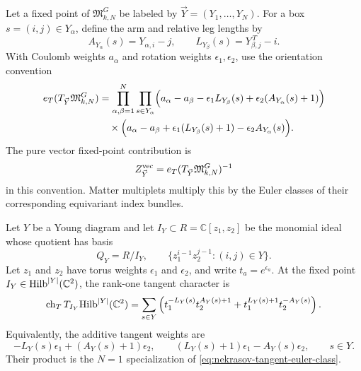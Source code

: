 \begin{definition}
\label{def:nekrasov-tangent-euler-class}
Let a fixed point of \(\mathfrak M_{k,N}^{G}\) be labeled by
\(\vec Y=(Y_1,\ldots,Y_N)\).  For a box \(s=(i,j)\in Y_\alpha\), define the
arm and relative leg lengths by
\[
  A_{Y_\alpha}(s)=Y_{\alpha,i}-j,
  \qquad
  L_{Y_\beta}(s)=Y_{\beta,j}^{\,T}-i .
\]
With Coulomb weights \(a_\alpha\) and rotation weights
\(\epsilon_1,\epsilon_2\), use the orientation convention
\begin{equation}
\begin{aligned}
  e_T(T_{\vec Y}\mathfrak M_{k,N}^{G})
  &=
  \prod_{\alpha,\beta=1}^{N}
  \prod_{s\in Y_\alpha}
  \Bigl(a_\alpha-a_\beta
  -\epsilon_1L_{Y_\beta}(s)
  +\epsilon_2(A_{Y_\alpha}(s)+1)\Bigr)
\\
  &\quad\times
  \Bigl(a_\alpha-a_\beta
  +\epsilon_1(L_{Y_\beta}(s)+1)
  -\epsilon_2A_{Y_\alpha}(s)\Bigr).
  \label{eq:nekrasov-tangent-euler-class}
\end{aligned}
\end{equation}
The pure vector fixed-point contribution is
\[
  Z_{\vec Y}^{\rm vec}
  =
  e_T(T_{\vec Y}\mathfrak M_{k,N}^{G})^{-1}
\]
in this convention.  Matter multiplets multiply this by the Euler classes of
their corresponding equivariant index bundles.
\end{definition}

\begin{proposition}
\label{prop:rank-one-hilbert-tangent-character}
Let \(Y\) be a Young diagram and let
\(I_Y\subset R=\mathbb C[z_1,z_2]\) be the monomial ideal whose quotient has
basis
\[
  Q_Y=R/I_Y,\qquad
  \{z_1^{i-1}z_2^{j-1}:(i,j)\in Y\}.
\]
Let \(z_1\) and \(z_2\) have torus weights
\(\epsilon_1\) and \(\epsilon_2\), and write \(t_a=e^{\epsilon_a}\).  At the
fixed point \(I_Y\in{\rm Hilb}^{|Y|}(\mathbb C^2)\), the rank-one tangent
character is
\begin{equation}
  \operatorname{ch}_{T}T_{I_Y}{\rm Hilb}^{|Y|}(\mathbb C^2)
  =
  \sum_{s\in Y}
  \left(
    t_1^{-L_Y(s)}t_2^{A_Y(s)+1}
    +
    t_1^{L_Y(s)+1}t_2^{-A_Y(s)}
  \right).
  \label{eq:rank-one-hilbert-tangent-character}
\end{equation}
Equivalently, the additive tangent weights are
\[
  -L_Y(s)\epsilon_1+(A_Y(s)+1)\epsilon_2,
  \qquad
  (L_Y(s)+1)\epsilon_1-A_Y(s)\epsilon_2,
  \qquad s\in Y .
\]
Their product is the \(N=1\) specialization of
\eqref{eq:nekrasov-tangent-euler-class}.
\end{proposition}


